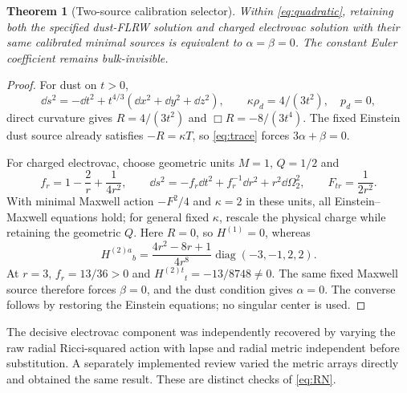 \documentclass[11pt]{article}
\newtheorem{theorem}{Theorem}[section]\newtheorem{proposition}[theorem]{Proposition}
\begin{document}
\begin{theorem}[Two-source calibration selector]\label{thm:quadratic}
Within \eqref{eq:quadratic}, retaining both the specified dust-FLRW solution and charged electrovac solution with their same calibrated minimal sources is equivalent to $\alpha=\beta=0$. The constant Euler coefficient remains bulk-invisible.
\end{theorem}
\begin{proof}
For dust on $t>0$,
\[
\dd s^2=-\dd t^2+t^{4/3}(\dd x^2+\dd y^2+\dd z^2),\qquad
\kappa\rho_d=4/(3t^2),\quad p_d=0,
\]
direct curvature gives $R=4/(3t^2)$ and $\Box R=-8/(3t^4)$. The fixed Einstein dust source already satisfies $-R=\kappa T$, so \eqref{eq:trace} forces $3\alpha+\beta=0$.

For charged electrovac, choose geometric units $M=1$, $Q=1/2$ and
\[
f_r=1-\frac2r+\frac1{4r^2},\qquad
\dd s^2=-f_r\dd t^2+f_r^{-1}\dd r^2+r^2\dd\Omega_2^2,
\qquad F_{tr}=\frac1{2r^2}.
\]
With minimal Maxwell action $-F^2/4$ and $\kappa=2$ in these units, all Einstein--Maxwell equations hold; for general fixed $\kappa$, rescale the physical charge while retaining the geometric $Q$. Here $R=0$, so $H^{(1)}=0$, whereas
\begin{equation}\label{eq:RN}
H^{(2)a}{}_b=\frac{4r^2-8r+1}{4r^8}\operatorname{diag}(-3,-1,2,2).
\end{equation}
At $r=3$, $f_r=13/36>0$ and $H^{(2)t}{}_t=-13/8748\ne0$. The same fixed Maxwell source therefore forces $\beta=0$, and the dust condition gives $\alpha=0$. The converse follows by restoring the Einstein equations; no singular center is used.
\end{proof}

The decisive electrovac component was independently recovered by varying the raw radial Ricci-squared action with lapse and radial metric independent before substitution. A separately implemented review varied the metric arrays directly and obtained the same result. These are distinct checks of \eqref{eq:RN}.
\end{document}
